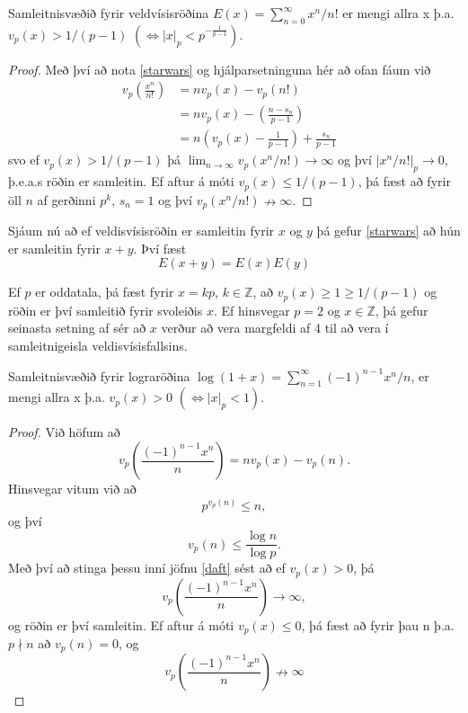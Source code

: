\begin{setn}
Samleitnisvæðið fyrir veldvísisröðina $E(x) = \sum_{n=0}^{\infty} x^n/n!$ er mengi allra x þ.a.
$v_p(x)>1/(p-1)$  $(\iff |x|_p < p^{- \frac{1}{p-1}} )$.
\end{setn}
\begin{proof}
Með því að nota \ref{starwars} og hjálparsetninguna hér að ofan fáum við
\begin{align*}
v_p \left( \frac{x^n}{n!} \right) & =  n v_p (x) - v_p(n!) & \\
 & =  n v_p (x) - \left( \frac{n - s_n}{p-1} \right) &\\ 
 & =  n \left( v_p (x) - \frac{1}{p-1} \right) + \frac{s_n}{p-1}&
\end{align*}
svo ef $v_p (x) > 1/(p-1)$ þá $\lim_{n\rightarrow \infty } v_p (x^n/n!) \rightarrow \infty$ 
og því $|x^n/n!|_p \rightarrow 0$, þ.e.a.s röðin er samleitin.
Ef aftur á móti $v_p(x) \leq 1/(p-1)$, þá fæst að fyrir öll $n$ af gerðinni $p^k$,  $s_n = 1$ og því $v_p(x^n/n!) \nrightarrow \infty$.
\end{proof}

Sjáum nú að ef veldisvísisröðin er samleitin fyrir $x$ og $y$ þá gefur \ref{starwars} að hún er samleitin fyrir $x+y$. Því fæst
\begin{equation*}
E(x+y) = E(x) E(y)
\end{equation*}

\begin{daemi}
Ef $p$ er oddatala, þá fæst fyrir $x = kp$, $k \in \mathbb{Z}$, að $v_p(x) \geq 1 \geq 1/(p-1)$ og röðin er því samleitið fyrir svoleiðis $x$.
Ef hinsvegar $p=2$ og $x \in \mathbb{Z}$, þá gefur seinasta setning af sér að $x$ verður að vera margfeldi af 4 til að vera í samleitnigeisla veldisvísisfallsins. 
\end{daemi}

\begin{setn}
Samleitnisvæðið fyrir lograröðina $\log(1+x) = \sum_{n=1}^{\infty} (-1)^{n-1}x^n/n$, er mengi allra x þ.a. $v_p(x)>0$  $(\iff |x|_p<1)$.
\end{setn}
\begin{proof}
Við höfum að 
\begin{equation} \label{daft}
v_p \left( \frac{(-1)^{n-1}x^n}{n} \right) = n v_p(x) - v_p (n).
\end{equation}
Hinsvegar vitum við að 
\begin{equation*}
p^{v_p (n)} \leq n,
\end{equation*}
og því 
\begin{equation*}
v_p (n) \leq \frac{\log n}{\log p}.
\end{equation*}
Með því að stinga þessu inní jöfnu \ref{daft} sést að ef $v_p (x)> 0$, þá
\begin{equation*}
v_p \left( \frac{(-1)^{n-1}x^n}{n} \right) \rightarrow \infty,
\end{equation*}
og röðin er því samleitin. Ef aftur á móti $v_p (x) \leq 0$, þá fæst að fyrir þau n þ.a. $p \nmid n $ að $v_p(n)=0$, og
\begin{equation*}
v_p \left( \frac{(-1)^{n-1}x^n}{n} \right) \nrightarrow \infty
\end{equation*}
\end{proof}

